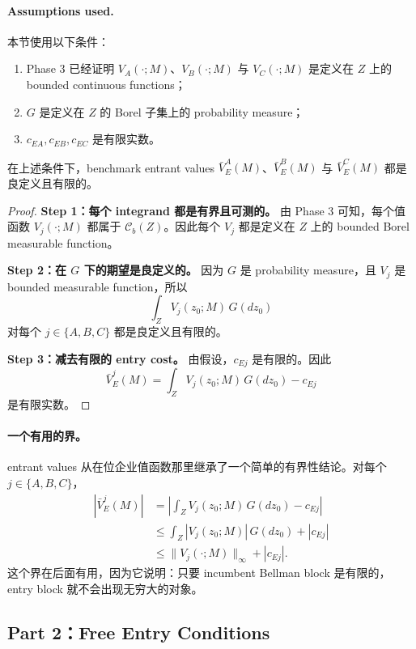 \paragraph{Assumptions used.}
本节使用以下条件：
\begin{enumerate}
    \item Phase 3 已经证明 $V_A(\cdot;M)$、$V_B(\cdot;M)$ 与 $V_C(\cdot;M)$ 是定义在 $Z$ 上的 bounded continuous functions；
    \item $G$ 是定义在 $Z$ 的 Borel 子集上的 probability measure；
    \item $c_{EA},c_{EB},c_{EC}$ 是有限实数。
\end{enumerate}

\begin{proposition}
在上述条件下，benchmark entrant values $\bar V_E^A(M)$、$\bar V_E^B(M)$ 与 $\bar V_E^C(M)$ 都是良定义且有限的。
\end{proposition}

\begin{proof}
\medskip\noindent\textbf{Step 1：每个 integrand 都是有界且可测的。}
由 Phase 3 可知，每个值函数 $V_j(\cdot;M)$ 都属于 $\mathcal C_b(Z)$。因此每个 $V_j$ 都是定义在 $Z$ 上的 bounded Borel measurable function。

\medskip\noindent\textbf{Step 2：在 $G$ 下的期望是良定义的。}
因为 $G$ 是 probability measure，且 $V_j$ 是 bounded measurable function，所以
\[
\int_Z V_j(z_0;M)\,G(dz_0)
\]
对每个 $j\in\{A,B,C\}$ 都是良定义且有限的。

\medskip\noindent\textbf{Step 3：减去有限的 entry cost。}
由假设，$c_{Ej}$ 是有限的。因此
\[
\bar V_E^j(M)=\int_Z V_j(z_0;M)\,G(dz_0)-c_{Ej}
\]
是有限实数。
\end{proof}

\paragraph{一个有用的界。}
entrant values 从在位企业值函数那里继承了一个简单的有界性结论。对每个 $j\in\{A,B,C\}$，
\begin{align*}
\left|\bar V_E^j(M)\right|
&=
\left|\int_Z V_j(z_0;M)\,G(dz_0)-c_{Ej}\right|\\
&\le
\int_Z |V_j(z_0;M)|\,G(dz_0)+|c_{Ej}|\\
&\le
\|V_j(\cdot;M)\|_\infty+|c_{Ej}|.
\end{align*}
这个界在后面有用，因为它说明：只要 incumbent Bellman block 是有限的，entry block 就不会出现无穷大的对象。

\subsection{Part 2：Free Entry Conditions}

